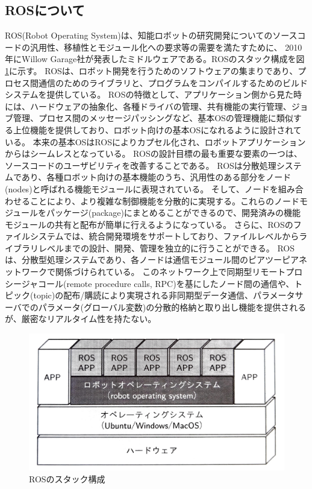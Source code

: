 \subsection{ROSについて}
ROS(Robot Operating System)\cite{auto:ROS}は、知能ロボットの研究開発についてのソースコードの汎用性、移植性とモジュール化への要求等の需要を満たすために、
2010年にWillow Garage社が発表したミドルウェアである。ROSのスタック構成を図\ref{auto:ros}に示す。
ROSは、ロボット開発を行うためのソフトウェアの集まりであり、プロセス間通信のためのライブラリと、プログラムをコンパイルするためのビルドシステムを提供している。
ROSの特徴として、アプリケーション側から見た時には、ハードウェアの抽象化、各種ドライバの管理、共有機能の実行管理、ジョブ管理、プロセス間のメッセージパッシングなど、基本OSの管理機能に類似する上位機能を提供しており、ロボット向けの基本OSになれるように設計されている。
本来の基本OSはROSによりカプセル化され、ロボットアプリケーションからはシームレスとなっている。
ROSの設計目標の最も重要な要素の一つは、ソースコードのユーザビリティを改善することである。
ROSは分散処理システムであり、各種ロボット向けの基本機能のうち、汎用性のある部分をノード(nodes)と呼ばれる機能モジュールに表現されている。
そして、ノードを組み合わせることにより、より複雑な制御機能を分散的に実現する。これらのノードモジュールをパッケージ(package)にまとめることができるので、開発済みの機能モジュールの共有と配布が簡単に行えるようになっている。
さらに、ROSのファイルシステムでは、統合開発環境をサポートしており、ファイルレベルからライブラリレベルまでの設計、開発、管理を独立的に行うことができる。
ROSは、分散型処理システムであり、各ノードは通信モジュール間のピアツーピアネットワークで関係づけられている。
このネットワーク上で同期型リモートプロシージャコール(remote procedure calls, RPC)を基にしたノード間の通信や、トピック(topic)の配布/購読により実現される非同期型データ通信、パラメータサーバでのパラメータ(グローバル変数)の分散的格納と取り出し機能を提供されるが、厳密なリアルタイム性を持たない。

\begin{figure}[h]
  \begin{center}
    \includegraphics[width=.75\linewidth]{img/auto_5.pdf}
    \caption{ROSのスタック構成}
    \label{auto:ros}
  \end{center}
\end{figure}

